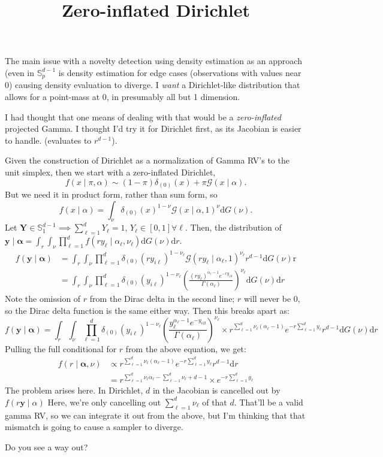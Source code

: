 \documentclass{article}
\title{Zero-inflated Dirichlet}
\date{}
\begin{document}
\maketitle 
The main issue with a novelty detection using density estimation as an approach 
(even in $\mathbb{S}_p^{d-1}$ is density estimation for edge cases 
(observations with values near 0) causing density evaluation to diverge.  I \emph{want} a
Dirichlet-like distribution that allows for a point-mass at 0, in presumably all but 1 dimension.

I had thought that one means of dealing with that would be a \emph{zero-inflated} projected 
Gamma. I thought I'd try it for Dirichlet first, as its Jacobian is easier to handle.
(evaluates to $r^{d-1}$).

Given the construction of Dirichlet as a normalization of Gamma RV's to the unit simplex,
then we start with a zero-inflated Dirichlet,
\[
f(x\mid\pi,\alpha) \sim (1 - \pi)\delta_{(0)}(x) + \pi\mathcal{G}(x\mid\alpha).
\]
But we need it in product form, rather than sum form, so
\[
f(x\mid\alpha) = \int_{\nu}\delta_{(0)}(x)^{1 - \nu}\mathcal{G}(x\mid\alpha,1)^{\nu}\text{d}G(\nu).
\]
Let $\bm{Y} \in \mathbb{S}_1^{d-1} \implies \sum_{\ell = 1}^d Y_{\ell} = 1$, $Y_{\ell} \in [0, 1] \forall \ell$.  Then, the distribution of $\bm{y}\mid\bm{\alpha} = \int_r \int_{\nu} \prod_{\ell = 1}^d f(ry_{\ell}\mid\alpha_{\ell},\nu_{\ell})\text{d}G(\nu)\text{d}r$.
\[
\begin{aligned}
f(\bm{y}\mid\bm{\alpha}) &= \int_r \int_{\nu} \prod_{\ell = 1}^d \delta_{(0)}(ry_{i\ell})^{1 - \nu_{\ell}}\mathcal{G}(ry_{\ell}\mid\alpha_{\ell},1)^{\nu_{\ell}}r^{d-1}\text{d}G(\nu)\text{r} \\ 
&= \int_r\int_{\nu}\prod_{\ell = 1}^d\delta_{(0)}(y_{i\ell})^{1 - \nu_{\ell}}\left(\frac{(ry_{\ell})^{\alpha_{\ell} - 1} e^{-ry_{ell}}}{\Gamma(\alpha_{\ell})}\right)^{\nu_{\ell}}\text{d}G(\nu)\text{d}r
\end{aligned}
\]
Note the omission of $r$ from the Dirac delta in the second line; $r$ will never be 0, so the Dirac delta function is the same either way.  Then this breaks apart as:
\[
f(\bm{y}\mid\bm{\alpha}) = \int_{r}\int_{\nu}\prod_{\ell = 1}^{d}\delta_{(0)}(y_{i\ell})^{1 - \nu_{\ell}}\left(\frac{y_{\ell}^{\alpha_{\ell} - 1} e^{-y_{ell}}}{\Gamma(\alpha_{\ell})}\right)^{\nu_{\ell}}\times r^{\sum_{\ell = 1}^d\nu_\ell(\alpha_{\ell} - 1)}e^{-r\sum_{\ell = 1}^dy_{\ell}}r^{d-1}\text{d}G(\nu)\text{d}r
\]
Pulling the full conditional for $r$ from the above equation, we get:
\[
\begin{aligned}
f(r\mid\bm{\alpha},\nu) &\propto 
    r^{\sum_{\ell = 1}^d\nu_\ell(\alpha_{\ell} - 1)}
    e^{-r\sum_{\ell = 1}^dy_{\ell}}
    r^{d-1}
    \text{d}r\\
    &= r^{\sum_{\ell = 1}^d\nu_\ell\alpha_{\ell} - \sum_{\ell - 1}^{d}\nu_{\ell} + d - 1}\times e^{-r\sum_{\ell = 1}^dy_{\ell}}
\end{aligned}
\]
The problem arises here.  In Dirichlet, $d$ in the Jacobian is cancelled out by $f(r\bm{y}\mid\alpha)$  Here, we're only cancelling out $\sum_{\ell = 1}^d\nu_{\ell}$ of that $d$.
That'll be a valid gamma RV, so we can integrate it out from the above, but I'm thinking that that mismatch is going to cause a sampler to diverge.

Do you see a way out?
    
\end{document}
